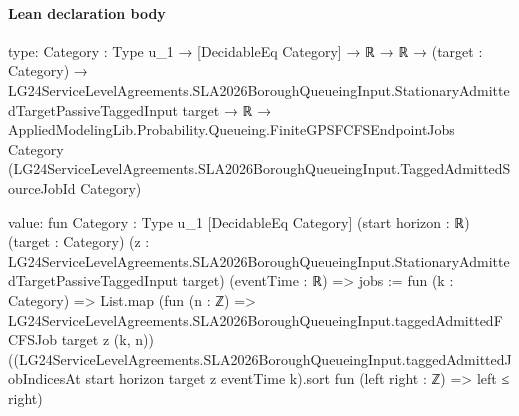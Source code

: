 \documentclass[10pt]{article}
\begin{document}
\paragraph{Lean declaration body}
\begin{ReviewVerbatim}
type:
{Category : Type u_1} →
  [DecidableEq Category] →
    ℝ →
      ℝ →
        (target : Category) →
          LG24ServiceLevelAgreements.SLA2026BoroughQueueingInput.StationaryAdmittedTargetPassiveTaggedInput target →
            ℝ →
              AppliedModelingLib.Probability.Queueing.FiniteGPSFCFSEndpointJobs Category
                (LG24ServiceLevelAgreements.SLA2026BoroughQueueingInput.TaggedAdmittedSourceJobId Category)

value:
fun {Category : Type u_1} [DecidableEq Category] (start horizon : ℝ) (target : Category)
    (z : LG24ServiceLevelAgreements.SLA2026BoroughQueueingInput.StationaryAdmittedTargetPassiveTaggedInput target)
    (eventTime : ℝ) =>
  {
    jobs := fun (k : Category) =>
      List.map
        (fun (n : ℤ) => LG24ServiceLevelAgreements.SLA2026BoroughQueueingInput.taggedAdmittedFCFSJob target z (k, n))
        ((LG24ServiceLevelAgreements.SLA2026BoroughQueueingInput.taggedAdmittedJobIndicesAt start horizon target z
              eventTime k).sort
          fun (left right : ℤ) => left ≤ right) }
\end{ReviewVerbatim}
\end{document}
